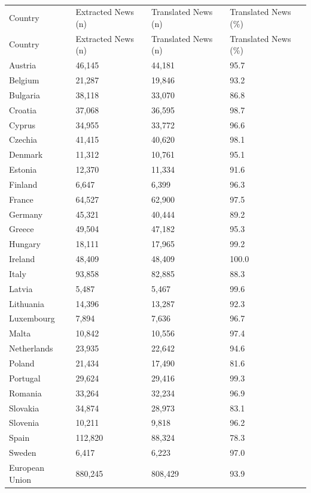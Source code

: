 \documentclass[
]{agujournal2019}
\begin{document}
\begin{longtable}[]{@{}llll@{}}

\caption{\label{tbl-translation}Translation Process (Rate of Success)}

\tabularnewline

\caption{}\label{T_542c5}\tabularnewline
\toprule\noalign{}
Country & Extracted News (n) & Translated News (n) & Translated News
(\%) \\
\midrule\noalign{}
\endfirsthead
\toprule\noalign{}
Country & Extracted News (n) & Translated News (n) & Translated News
(\%) \\
\midrule\noalign{}
\endhead
\bottomrule\noalign{}
\endlastfoot
Austria & 46,145 & 44,181 & 95.7 \\
Belgium & 21,287 & 19,846 & 93.2 \\
Bulgaria & 38,118 & 33,070 & 86.8 \\
Croatia & 37,068 & 36,595 & 98.7 \\
Cyprus & 34,955 & 33,772 & 96.6 \\
Czechia & 41,415 & 40,620 & 98.1 \\
Denmark & 11,312 & 10,761 & 95.1 \\
Estonia & 12,370 & 11,334 & 91.6 \\
Finland & 6,647 & 6,399 & 96.3 \\
France & 64,527 & 62,900 & 97.5 \\
Germany & 45,321 & 40,444 & 89.2 \\
Greece & 49,504 & 47,182 & 95.3 \\
Hungary & 18,111 & 17,965 & 99.2 \\
Ireland & 48,409 & 48,409 & 100.0 \\
Italy & 93,858 & 82,885 & 88.3 \\
Latvia & 5,487 & 5,467 & 99.6 \\
Lithuania & 14,396 & 13,287 & 92.3 \\
Luxembourg & 7,894 & 7,636 & 96.7 \\
Malta & 10,842 & 10,556 & 97.4 \\
Netherlands & 23,935 & 22,642 & 94.6 \\
Poland & 21,434 & 17,490 & 81.6 \\
Portugal & 29,624 & 29,416 & 99.3 \\
Romania & 33,264 & 32,234 & 96.9 \\
Slovakia & 34,874 & 28,973 & 83.1 \\
Slovenia & 10,211 & 9,818 & 96.2 \\
Spain & 112,820 & 88,324 & 78.3 \\
Sweden & 6,417 & 6,223 & 97.0 \\
European Union & 880,245 & 808,429 & 93.9 \\

\end{longtable}
\end{document}

